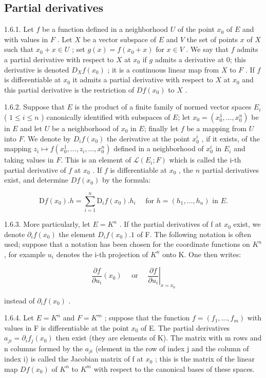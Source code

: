 \subsection{Partial derivatives}

1.6.1. Let \(f\) be a function defined in a neighborhood \(U\) of the point \(x_0\) of \(E\) and with values in \(F\) . Let \(X\) be a vector subspace of \(E\) and \(V\) the set of points \(x\) of \(X\) such that \(x_0 + x \in U\) ; set \(g(x) = f(x_0 + x)\) for \(x \in V\) . We say that \(f\) admits a partial derivative with respect to \(X\) at \(x_0\) if \(g\) admits a derivative at 0; this derivative is denoted \(D_X f(x_0)\) ; it is a continuous linear map from \(X\) to \(F\) . If \(f\) is differentiable at \(x_0\) it admits a partial derivative with respect to \(X\) at \(x_0\) and this partial derivative is the restriction of \(Df(x_0)\) to \(X\) .

1.6.2. Suppose that \(E\) is the product of a finite family of normed vector spaces \(E_{i}\) ( \(1 \leqslant i \leqslant n\) ) canonically identified with subspaces of \(E\); let \(x_{0} = (x_{0}^{1}, \ldots, x_{0}^{n})\) be in \(E\) and let \(U\) be a neighborhood of \(x_{0}\) in \(E\); finally let \(f\) be a mapping from \(U\) into \(F\). We denote by \(D_{i}f(x_{0})\) the derivative at the point \(x_{0}^{i}\) , if it exists, of the mapping \(z_{i} \mapsto f(x_{0}^{1}, \ldots, z_{i}, \ldots, x_{0}^{n})\) defined in a neighborhood of \(x_{0}^{i}\) in \(E_{i}\) and taking values in \(F\). This is an element of \(\mathcal{L}(E_{i}; F)\) which is called the i-th partial derivative of \(f\) at \(x_{0}\) . If \(f\) is differentiable at \(x_{0}\) , the \(n\) partial derivatives exist, and determine \(Df(x_{0})\) by the formula:

\[
\mathrm{D} f (x _ {0}). h = \sum_ {i = 1} ^ {n} \mathrm{D} _ {i} f (x _ {0}). h _ {i} \quad \text { for } h = (h _ {1}, \dots , h _ {n}) \text { in } E.
\]

1.6.3. More particularly, let \(E = K^{n}\) . If the partial derivatives of f at \(x_{0}\) exist, we denote \(\partial_{i}f(x_{0})\) the element \(D_{i}f(x_{0}).1\) of F. The following notation is often used; suppose that a notation has been chosen for the coordinate functions on \(K^{n}\) , for example \(u_{i}\) denotes the i-th projection of \(K^{n}\) onto K. One then writes:

\[
\frac {\partial f}{\partial u _ {i}} \left(x _ {0}\right) \quad \text { or } \quad \left. \frac {\partial f}{\partial u _ {i}} \right| _ {x = x _ {0}}
\]

instead of \(\partial_{i}f(x_{0})\) .

1.6.4. Let \(E = K^{n}\) and \(F = K^{m}\) ; suppose that the function \(f = (f_{1}, \ldots, f_{m})\) with values in F is differentiable at the point \(x_{0}\) of E. The partial derivatives \(a_{ji} = \partial_{i} f_{j}(x_{0})\) then exist (they are elements of K). The matrix with m rows and n columns formed by the \(a_{ji}\) (element in the row of index j and the column of index i) is called the Jacobian matrix of f at \(x_{0}\) ; this is the matrix of the linear map \(Df(x_{0})\) of \(K^{n}\) to \(K^{m}\) with respect to the canonical bases of these spaces.

